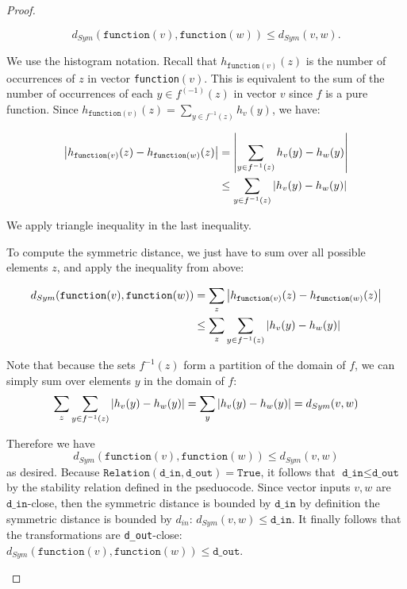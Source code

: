 \documentclass[11pt,a4paper]{article}
\newcommand{\grace}[1]{{ {\color{purple}{(grace)~#1}}}}
\newcommand{\din}{\texttt{d\_in}}
\newcommand{\dout}{\texttt{d\_out}}
\newcommand{\Relation}{\texttt{Relation}}
\newcommand{\function}{\texttt{function}}
\begin{document}
\begin{proof}
\begin{enumerate}
$$d_{Sym}(\texttt{function}(v), \texttt{function}(w)) \leq d_{Sym}(v, w).$$

We use the histogram notation. Recall that $h_{\texttt{function}(v)}(z)$ is the number of occurrences of $z$ in vector \texttt{function}$(v)$. This is equivalent to the sum of the number of occurrences of each $y \in f^{(-1)}(z)$ in vector $v$ since $f$ is a pure function. \grace{Does $f$ have to be onto function?} Since $h_{\texttt{function}(v)}(z) = \sum_{y \in f^{-1}(z)} h_v(y)$, we have:

\begin{align*}
    \abs{h_{\texttt{function}(v)}(z) - h_{\texttt{function}(w)}(z)} &= \abs{\sum_{y \in f^{-1}(z)} h_v(y) - h_w(y)}\\
    &\leq \sum_{y \in f^{-1}(z)} \abs{h_v(y) - h_w(y)}
\end{align*}


We apply triangle inequality in the last inequality.

To compute the symmetric distance, we just have to sum over all possible elements $z$, and apply the inequality from above:

\begin{align*}
    d_{Sym}(\texttt{function}(v), \texttt{function}(w)) &= 
    \sum_z \abs{h_{\texttt{function}(v)}(z) - h_{\texttt{function}(w)}(z)} \\
    &\leq \sum_z \sum_{y \in f^{-1}(z)} \abs{h_v(y) - h_w(y)}\\
\end{align*}

Note that because the sets $f^{-1}(z)$ form a partition of the domain of $f$, we can simply sum over elements $y$ in the domain of $f$: $$\sum_z \sum_{y \in f^{-1}(z)} \abs{h_v(y) - h_w(y)} = \sum_y \abs{h_{v}(y) - h_{w}(y)} = d_{Sym}(v, w)$$

Therefore we have $$d_{Sym}(\texttt{function}(v), \texttt{function}(w)) \leq d_{Sym}(v, w)$$ as desired.
Because $\Relation(\din, \dout) = \texttt{True}$, it follows that $\din \leq \dout$ by the stability relation defined in the pseduocode. Since vector inputs $v, w$ are $\din$-close, then the symmetric distance is bounded by $\din$ by definition the symmetric distance is bounded by $d_{in}$: $d_{Sym}(v, w) \leq \din$. It finally follows that the transformations are \dout-close: $d_{Sym}(\function(v), \function(w)) \leq \dout$.
\end{enumerate}
\end{proof}
\end{document}
